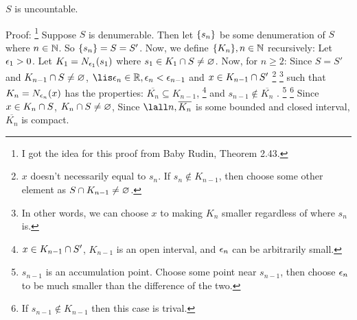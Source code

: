 \documentclass[10pt, letterpaper, titlepage]{article}
\begin{document}
      \begin{theorem}
        $S$ is uncountable.
      \end{theorem}
      Proof:
      \footnote{I got the idea for this proof from Baby Rudin, Theorem 2.43.}
      Suppose $S$ is denumerable.
      Then let $\{ s_n \}$ be some denumeration of $S$ where $n \in \mathbb{N}$.
      So $\{ s_n \} = S = S'$.
      Now, we define $\{ K_n \}, n\in\mathbb{N}$ recursively:
      Let $\epsilon_1 > 0$.
      Let $K_1 = N_{\epsilon_1}(s_1)$ where
      $s_1 \in K_1 \cap S \neq \varnothing$.
      Now, for $n \geq 2$: %
      Since $S = S'$ and $K_{n-1} \cap S \neq \varnothing$,
      $\lis \e_n \in \R , \e_n < \e_{n-1}$
      and $x \in K_{n-1} \cap S'$ 
      \footnote{$x$ doesn't necessarily equal to $s_n$. 
        If $s_n \not\in K_{n-1}$,
        then choose some other element as $S \cap K_{n-1} \neq \varnothing$.}
      \footnote{In other words, 
        we can choose $x$ to making $K_n$ smaller regardless of where $s_n$ is.}
      such that 
      $K_n = N_{\epsilon_n}(x)$ 
      has the properties: 
      $\overline{K_n} \subseteq K_{n-1}$,
      \footnote{$x \in K_{n-1} \cap S'$, $K_{n-1}$ is an open interval, 
      and $\epsilon_n$ can be arbitrarily small.}
      and
      $s_{n-1} \not\in \overline{K_n}$ .
      \footnote{$s_{n-1}$ is an accumulation point. 
      Choose some point near $s_{n-1}$, 
      then choose $\epsilon_n$ to be much smaller than the difference of the two.}
      \footnote{If $s_{n-1} \not\in K_{n-1}$ then this case is trival.}
      Since $x \in K_n \cap S$, 
      $K_n \cap S \neq \varnothing$,
      Since $\lall n, \overline{K_n}$ is some bounded and closed interval, 
      $\overline{K_n}$ is compact.

      
\end{document}
